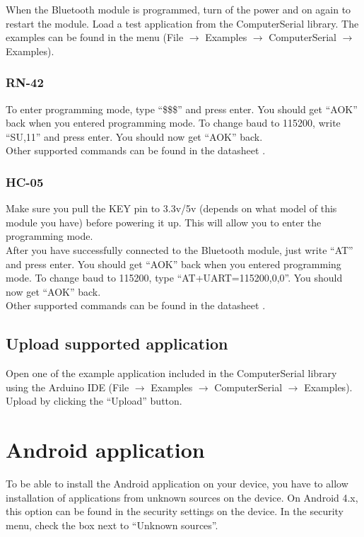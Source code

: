 			When the Bluetooth module is programmed, turn of the power and on again to restart the module. Load a test application from the ComputerSerial library. The examples can be found in the menu (File $\rightarrow$ Examples $\rightarrow$ ComputerSerial $\rightarrow$ Examples).
			
				\subsubsection{RN-42}
				To enter programming mode, type ``\$\$\$'' and press enter. You should get ``AOK'' back when you entered programming mode. To change baud to 115200, write ``SU,11'' and press enter. You should now get ``AOK'' back.\\
				
				Other supported commands can be found in the datasheet \cite{rn-42-at-commands}.

				\subsubsection{HC-05}
				Make sure you pull the KEY pin to 3.3v/5v (depends on what model of this module you have) before powering it up. This will allow you to enter the programming mode.\\
				
				After you have successfully connected to the Bluetooth module, just write ``AT'' and press enter. You should get ``AOK'' back when you entered programming mode. To change baud to 115200, type ``AT+UART=115200,0,0''. You should now get ``AOK'' back.\\
				
				Other supported commands can be found in the datasheet \cite{hc-05-at-commands}.
			
			\subsection{Upload supported application}\label{sec:upload-application}
			Open one of the example application included in the ComputerSerial library using the Arduino IDE \cite{download-arduino} (File $\rightarrow$ Examples $\rightarrow$ ComputerSerial $\rightarrow$ Examples). Upload by clicking the ``Upload'' button.
				
	\section{Android application}\label{sec:install-android-application}
	To be able to install the Android application on your device, you have to allow installation of applications from unknown sources on the device. On Android 4.x, this option can be found in the security settings on the device. In the security menu, check the box next to ``Unknown sources''. \\


